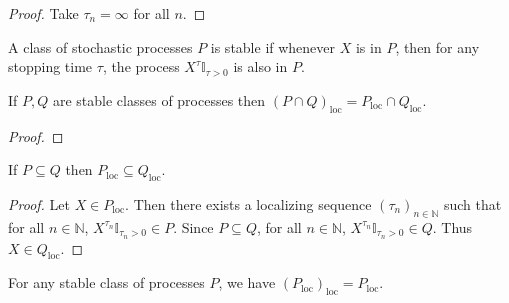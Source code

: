 \begin{proof}\leanok
Take $\tau_n = \infty$ for all $n$.
\end{proof}


\begin{definition}\label{def:stable}
  \leanok
A class of stochastic processes $P$ is stable if whenever $X$ is in $P$, then for any stopping time $\tau$, the process $X^{\tau}\mathbb{I}_{\tau > 0}$ is also in $P$.
\end{definition}


\begin{lemma}\label{lem:locally_inter}
  \leanok
If $P, Q$ are stable classes of processes then $(P\cap Q)_{\mathrm{loc}} = P_{\mathrm{loc}}\cap Q_{\mathrm{loc}}$.
\end{lemma}

\begin{proof}\leanok

\end{proof}


\begin{lemma}\label{lem:locally_mono}
  \leanok
If $P \subseteq Q$ then $P_{\mathrm{loc}} \subseteq Q_{\mathrm{loc}}$.
\end{lemma}

\begin{proof}\leanok
Let $X \in P_{\mathrm{loc}}$.
Then there exists a localizing sequence $(\tau_n)_{n \in \mathbb{N}}$ such that for all $n \in \mathbb{N}$, $X^{\tau_n}\mathbb{I}_{\tau_n > 0} \in P$.
Since $P \subseteq Q$, for all $n \in \mathbb{N}$, $X^{\tau_n}\mathbb{I}_{\tau_n > 0} \in Q$.
Thus $X \in Q_{\mathrm{loc}}$.
\end{proof}


\begin{lemma}\label{lem:locally_locally}
  \leanok
For any stable class of processes $P$, we have $(P_{\mathrm{loc}})_{\mathrm{loc}} = P_{\mathrm{loc}}$.
\end{lemma}

